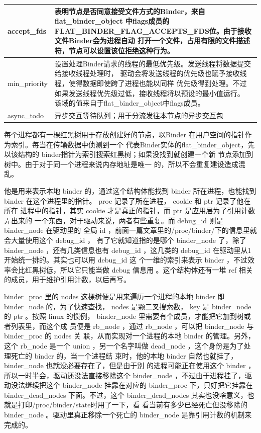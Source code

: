\documentclass[a4paper,11pt]{article}
\begin{document}
\begin{longtable}{|p{}|p{}|}
      \\\hline
      accept_fds & 表明节点是否同意接受文件方式的Binder，来自flat_binder_object
      中flags成员的FLAT_BINDER_FLAG_ACCEPTS_FDS位。由于接收文件Binder会为进程自动
      打开一个文件，占用有限的文件描述符，节点可以设置该位拒绝这种行为。
      \\\hline
      min_priority & 设置处理Binder请求的线程的最低优先级。发送线程将数据提交给接收线程处理时，
      驱动会将发送线程的优先级也赋予接收线程，使得数据即使跨了进程也能以同样
      优先级得到处理。不过如果发送线程优先级过低，接收线程将以预设的最小值运行。
      该域的值来自于flat_binder_object中flags成员。\\\hline
      async_todo & 异步交互等待队列；用于分流发往本节点的异步交互包 \\\hline
  \end{longtable}
    每个进程都有一棵红黑树用于存放创建好的节点，以Binder
    在用户空间的指针作为索引。每当在传输数据中侦测到一个
    代表Binder实体的flat_binder_object，先以该结构的
    binder指针为索引搜索红黑树；如果没找到就创建一个新
    节点添加到树中。由于对于同一个进程来说内存地址是唯一
    的，所以不会重复建设造成混乱。


他是用来表示本地 binder 的，通过这个结构体能找到 binder 所在进程，也能找到
binder 在这个进程里的指针。 proc 记录了所在进程， cookie 和 ptr 记录了他在所在
进程中的指针，其实 cookie 才是真正的指针，而 ptr 是应用层为了引用计数弄出来的
一个东西，对于驱动来说，两者有些重复。而 debug_id 则是 binder_node 在驱动里的
全局 id ，前面一篇文章里的/proc/binder/下的信息里就会大量使用这个 debug_id ，
有了它就知道指的是哪个 binder_node 了，除了 binder_node ，还有几类信息也有
debug_id ，这几类的 debug_id 在驱动里从1开始统一排的。其实也可以用 debug_id 这
个一维的索引来表示 binder ，不过效率会比红黑树低，所以它只能当做 debug 信息用
。这个结构体还有一堆 ref 相关的成员，用于维护引用计数，以后再写。


 binder_proc 里的 nodes 这棵树便是用来遍历一个进程的本地 binder 即 binder_node
 的，为了快速查找， nodes 是颗二叉搜索数， key 是 binder_node 的 ptr 。按照
 linux 的惯例， binder_node 里需要有个成员，才能把它加到树或者列表里，而这个成
 员便是 rb_node ，通过 rb_node ，可以把 binder_node 与 binder_proc 的 nodes 关
 联，从而实现对一个进程的本地 binder 的管理。另外，这个 rb_node 是一个 union
 ，另一个名字叫做 dead_node ，这个身份是为了处理死亡的 binder 的，当一个进程结
 束时，他的本地 binder 自然也就挂了， binder_node 也就没必要存在了，但是由于别
 的进程可能正在使用这个 binder ，所以一时半会，驱动还没法直接移除这个
 binder_node ，不过由于进程挂了，驱动没法继续把这个 binder_node 挂靠在对应的
 binder_proc 下，只好把它挂靠在 binder_dead_nodes 下面。不过，这个
 binder_dead_nodes 其实也没啥意义，也就是打印/proc/binder/state时用了一下，看
 看当前有多少已经死亡但没移除的 binder_node 。驱动里真正移除一个死亡的
 binder_node 是靠引用计数的机制来完成的。
\end{document}
